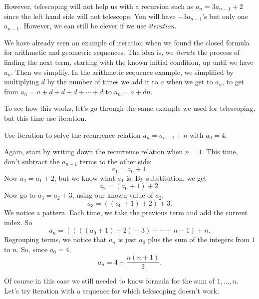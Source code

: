 \documentclass[12pt]{article}
\begin{document}
However, telescoping will not help us with a recursion such as $a_n = 3a_{n-1} + 2$ since the left hand side will not telescope.  You will have $-3a_{n-1}$'s but only one $a_{n-1}$.  However, we can still be clever if we use {\em iteration}.
%

We have already seen an example of iteration when we found the closed formula for arithmetic and geometric sequences.  The idea is, we {\em iterate} the process of finding the next term, starting with the known initial condition, up until we have $a_n$.  Then we simplify.  In the arithmetic sequence example, we simplified by multiplying $d$ by the number of times we add it to $a$ when we get to $a_n$, to get from $a_n = a + d + d + d + \cdots + d$ to $a_n = a + dn$.

To see how this works, let's go through the same example we used for telescoping, but this time use iteration.



\begin{example}
  Use iteration to solve the recurrence relation $a_n = a_{n-1} + n$ with $a_0 = 4$.

  \begin{solution}
    Again, start by writing down the recurrence relation when $n = 1$.  This time, don't subtract the $a_{n-1}$ terms to the other side:
    \[a_1 = a_0 + 1.\]
    Now $a_2 = a_1 + 2$, but we know what $a_1$ is.  By substitution, we get
    \[a_2 = (a_0 + 1) + 2.\]
    Now go to $a_3 = a_2 + 3$, using our known value of $a_2$:
    \[a_3 = ((a_0 + 1) + 2) + 3.\]
    We notice a pattern.  Each time, we take the previous term and add the current index.  So
    \[a_n = ((((a_0 + 1) +2)+3)+\cdots + n-1) + n.\]
    Regrouping terms, we notice that $a_n$ is just $a_0$ plus the sum of the integers from $1$ to $n$.  So, since $a_0 = 4$,
    \[a_n = 4 + \frac{n(n+1)}{2}.\]
  \end{solution}

\end{example}

 Of course in this case we still needed to know formula for the sum of $1,\ldots,n$.  Let's try iteration with a sequence for which telescoping doesn't work.
\end{document}
